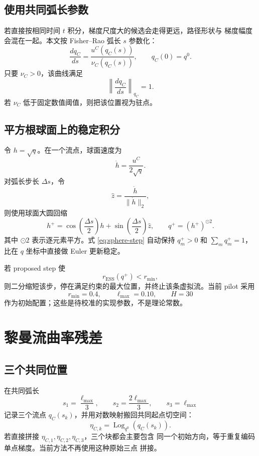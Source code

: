 \documentclass[UTF8,11pt]{ctexart}
\newcommand{\Log}{\operatorname{Log}}
\begin{document}
\subsection{使用共同弧长参数}

若直接按相同时间 \(t\) 积分，梯度尺度大的候选会走得更远，路径形状与
梯度幅度会混在一起。本文按 Fisher--Rao 弧长 \(s\) 参数化：
\[
    \frac{dq_C}{ds}
    =
    \frac{u^C(q_C(s))}{\nu_C(q_C(s))},
    \qquad
    q_C(0)=q^0.
    \label{eq:unit-speed-flow}
\]
只要 \(\nu_C>0\)，该曲线满足
\[
    \left\|\frac{dq_C}{ds}\right\|_{q_C}=1.
\]
若 \(\nu_C\) 低于固定数值阈值，则把该位置视为驻点。

\subsection{平方根球面上的稳定积分}

令 \(h=\sqrt q\)。在一个流点，球面速度为
\[
    \dot h
    =
    \frac{u^C}{2\sqrt q}.
\]
对弧长步长 \(\Delta s\)，令
\[
    \widehat z
    =
    \frac{\dot h}{\|\dot h\|_2},
\]
则使用球面大圆回缩
\[
    h^+
    =
    \cos\!\left(\frac{\Delta s}{2}\right)h
    +
    \sin\!\left(\frac{\Delta s}{2}\right)\widehat z,
    \qquad
    q^+=(h^+)^{\odot2}.
    \label{eq:sphere-step}
\]
其中 \(\odot2\) 表示逐元素平方。式 \eqref{eq:sphere-step} 自动保持
\(q_m^+>0\) 和 \(\sum_mq_m^+=1\)，比在 \(q\) 坐标中直接做 Euler
更新稳定。

若 proposed step 使
\[
    r_{\mathrm{ESS}}(q^+)<r_{\min},
\]
则二分缩短该步，停在满足约束的最大位置，并终止该条虚拟流。当前 pilot
采用
\[
    r_{\min}=0.4,\qquad
    \ell_{\max}=0.10,\qquad
    H=30
\]
作为初始配置；这些是待校准的实现参数，不是理论常数。

\section{黎曼流曲率残差}

\subsection{三个共同位置}

在共同弧长
\[
    s_1=\frac{\ell_{\max}}3,\qquad
    s_2=\frac{2\ell_{\max}}3,\qquad
    s_3=\ell_{\max}
\]
记录三个流点 \(q_C(s_k)\)，并用对数映射搬回共同起点切空间：
\[
    \eta_{C,k}
    =
    \Log_{q^0}\!\left(q_C(s_k)\right).
\]
若直接拼接 \(\eta_{C,1},\eta_{C,2},\eta_{C,3}\)，三个块都会主要包含
同一个初始方向，等于重复编码单点梯度。当前方法不再使用这种原始三点
拼接。
\end{document}

